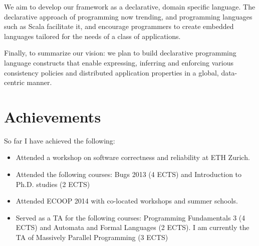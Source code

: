 \documentclass[]{usiinfprospectus}
\begin{document}
We aim to develop our framework as a declarative, domain specific language. The declarative approach of programming now trending, and programming languages such as Scala facilitate it, and encourage programmers to create embedded languages tailored for the needs of a class of applications. 

Finally, to summarize our vision: we plan to build declarative programming language constructs that enable expressing, inferring and enforcing various consistency policies and distributed application properties in a global, data-centric manner. 

\section{Achievements}
So far I have achieved the following:
\begin{itemize}
	\item Attended a workshop on software correctness and reliability at ETH Zurich.
	\item Attended the following courses: Bugs 2013 (4 ECTS) and Introduction to Ph.D. studies (2 ECTS) 
	\item Attended ECOOP 2014 with co-located workshops and summer schools.
	\item Served as a TA for the following courses: Programming Fundamentals 3 (4 ECTS) and Automata and Formal Languages (2 ECTS). I am currently the TA of Massively Parallel Programming (3 ECTS) 
\end{itemize}




\end{document}
